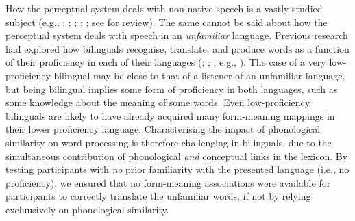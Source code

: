 \documentclass[
]{article}
\begin{document}
How the perceptual system deals with non-native speech is a vastly
studied subject (e.g., ; ;
;
;
; see
 for review).
The same cannot be said about how the perceptual system deals with
speech in an \emph{unfamiliar} language. Previous research had explored
how bilinguals recognise, translate, and produce words as a function of
their proficiency in each of their languages
(;
;
;
e.g., ). The
case of a very low-proficiency bilingual may be close to that of a
listener of an unfamiliar language, but being bilingual implies some
form of proficiency in both languages, such as some knowledge about the
meaning of some words. Even low-proficiency bilinguals are likely to
have already acquired many form-meaning mappings in their lower
proficiency language. Characterising the impact of phonological
similarity on word processing is therefore challenging in bilinguals,
due to the simultaneous contribution of phonological \emph{and}
conceptual links in the lexicon. By testing participants with \emph{no}
prior familiarity with the presented language (i.e., no proficiency), we
ensured that no form-meaning associations were available for
participants to correctly translate the unfamiliar words, if not by
relying excluusively on phonological similarity.
\end{document}
